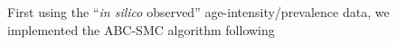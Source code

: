 \documentclass[11pt]{article}
\begin{document}

First using the ``\emph{in silico} observed'' age-intensity/prevalence data, we implemented the ABC-SMC algorithm following \cite{Sisson2009,Toni2009}
\end{document}
